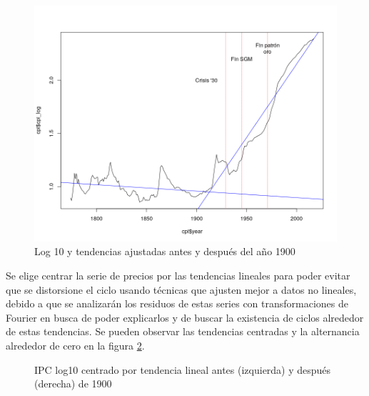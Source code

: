 \documentclass[a4paper]{article}
\begin{document}
\begin{figure}[H]
	\centering
	\includegraphics[width=0.8\linewidth]{cpi_log10_tend.png}
	\caption{Log 10 y tendencias ajustadas antes y después del año 1900} 	
	\label{fig:cpi_log10_tend}
\end{figure}

Se elige centrar la serie de precios por las tendencias lineales para poder evitar que se distorsione el ciclo usando técnicas que ajusten mejor a datos no lineales, debido a que se analizarán los residuos de estas series con transformaciones de Fourier en busca de poder explicarlos y de buscar la existencia de ciclos alrededor de estas tendencias. Se pueden observar las tendencias centradas y la alternancia alrededor de cero en la figura \ref{fig:cpi_log10_cntr}.

\begin{figure}[H]
	\centering
	\caption{IPC log10 centrado por tendencia lineal antes (izquierda) y después (derecha) de 1900} 	
	\label{fig:cpi_log10_cntr}
\end{figure}
\end{document}
